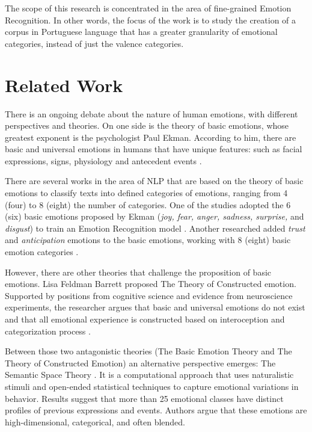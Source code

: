 \documentclass[12pt]{article}
\begin{document}
The scope of this research is concentrated in the area of fine-grained Emotion Recognition. In other words, the focus of the work is to study the creation of a corpus in Portuguese language that has a greater granularity of emotional categories, instead of just the valence categories.

\section{Related Work} 

There is an ongoing debate about the nature of human emotions, with different perspectives and theories. On one side is the theory of basic emotions, whose greatest exponent is the psychologist Paul Ekman. According to him, there are basic and universal emotions in humans that have unique features: such as facial expressions, signs, physiology and antecedent events \cite{Ekman1992}. 

There are several works in the area of NLP that are based on the theory of basic emotions to classify texts into defined categories of emotions, ranging from 4 (four) to 8 (eight) the number of categories. One of the studies adopted the 6 (six) basic emotions proposed by Ekman (\textit{joy, fear, anger, sadness, surprise,} and \textit{disgust}) to train an Emotion Recognition model \cite{Batbaatar2019}. Another researched added \textit{trust} and \textit{anticipation} emotions to the basic emotions, working with 8 (eight) basic emotion categories \cite{Sosea2020}.

However, there are other theories that challenge the proposition of basic emotions. Lisa Feldman Barrett proposed The Theory of Constructed emotion. Supported by positions from cognitive science and evidence from neuroscience experiments, the researcher argues that basic and universal emotions do not exist and that all emotional experience is constructed based on interoception and categorization process \cite{Barrett2016}.

Between those two antagonistic theories (The Basic Emotion Theory and The Theory of Constructed Emotion) an alternative perspective emerges: The Semantic Space Theory \cite{Cowen2021}. It is a computational approach that uses naturalistic stimuli and open-ended statistical techniques to capture emotional variations in behavior. Results suggest that more than 25 emotional classes have distinct profiles of previous expressions and events. Authors argue that these emotions are high-dimensional, categorical, and often blended.
\end{document}
